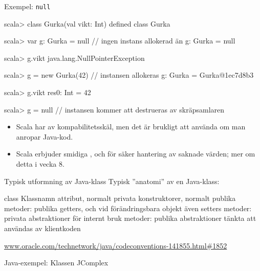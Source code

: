 \begin{Slide}{Exempel: \texttt{null}}
\begin{REPL}
scala> class Gurka(val vikt: Int)
defined class Gurka

scala> var g: Gurka = null        // ingen instans allokerad än
g: Gurka = null

scala> g.vikt
java.lang.NullPointerException

scala> g = new Gurka(42)          // instansen allokeras
g: Gurka = Gurka@1ec7d8b3

scala> g.vikt
res0: Int = 42

scala> g = null         // instansen kommer att destrueras av skräpsamlaren
\end{REPL}

\begin{itemize} \SlideFontSmall
\item Scala har  av kompabilitetsskäl, men det är brukligt att  använda  om man anropar Java-kod.

\item Scala erbjuder smidiga ,  och  för säker hantering av saknade värden; mer om detta i vecka 8.



\end{itemize}
\end{Slide}







\begin{Slide}{Typisk utformning av Java-klass}
Typisk ''anatomi'' av en Java-klass:
\begin{Code}[language=Java]
class Klassnamn {
    attribut, normalt privata
    konstruktorer, normalt publika
    metoder: publika getters, och vid förändringsbara objekt även setters
    metoder: privata abstraktioner för internt bruk
    metoder: publika abstraktioner tänkta att användas av klientkoden
}
\end{Code}
\href{http://www.oracle.com/technetwork/java/codeconventions-141855.html#1852}{www.oracle.com/technetwork/java/codeconventions-141855.html\#1852}
\end{Slide}




\begin{Slide}{Java-exempel: Klassen JComplex}\SlideFontSmall
{}
\end{Slide}




